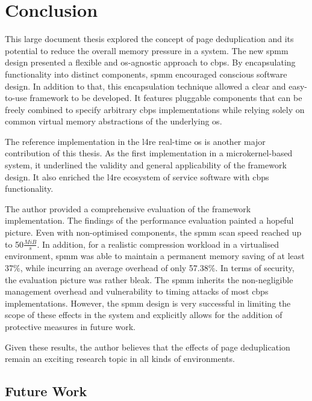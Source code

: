 \chapter{Conclusion}
\label{chap:conclusion}

This large document thesis explored the concept of page deduplication and its potential to reduce the overall memory pressure in a system.
The new \ac{spmm} design presented a flexible and \ac{os}-agnostic approach to \acl{cbps}.
By encapsulating functionality into distinct components, \ac{spmm} encouraged conscious software design.
In addition to that, this encapsulation technique allowed a clear and easy-to-use framework to be developed.
It features pluggable components that can be freely combined to specify arbitrary \ac{cbps} implementations while relying solely on common virtual memory abstractions of the underlying \ac{os}.

The reference implementation in the \ac{l4re} real-time \ac{os} is another major contribution of this thesis.
As the first implementation in a microkernel-based system, it underlined the validity and general applicability of the framework design.
It also enriched the \ac{l4re} ecosystem of service software with \ac{cbps} functionality.

The author provided a comprehensive evaluation of the framework implementation.
The findings of the performance evaluation painted a hopeful picture.
Even with non-optimised components, the \ac{spmm} scan speed reached up to 50$\frac{MiB}{s}$.
In addition, for a realistic compression workload in a virtualised environment, \ac{spmm} was able to maintain a permanent memory saving of at least 37\%, while incurring an average overhead of only 57.38\%.
In terms of security, the evaluation picture was rather bleak.
The \ac{spmm} inherits the non-negligible management overhead and vulnerability to timing attacks of most \ac{cbps} implementations.
However, the \ac{spmm} design is very successful in limiting the scope of these effects in the system and explicitly allows for the addition of protective measures in future work.

Given these results, the author believes that the effects of page deduplication remain an exciting research topic in all kinds of environments.

\section{Future Work}
\label{sec:future-work}

